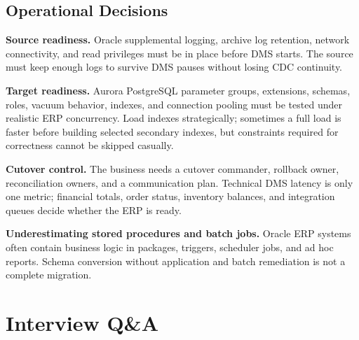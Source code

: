 \subsection{Operational Decisions}
\textbf{Source readiness.} Oracle supplemental logging, archive log retention, network connectivity, and read privileges must be in place before DMS starts. The source must keep enough logs to survive DMS pauses without losing CDC continuity.

\textbf{Target readiness.} Aurora PostgreSQL parameter groups, extensions, schemas, roles, vacuum behavior, indexes, and connection pooling must be tested under realistic ERP concurrency. Load indexes strategically; sometimes a full load is faster before building selected secondary indexes, but constraints required for correctness cannot be skipped casually.

\textbf{Cutover control.} The business needs a cutover commander, rollback owner, reconciliation owners, and a communication plan. Technical DMS latency is only one metric; financial totals, order status, inventory balances, and integration queues decide whether the ERP is ready.

\begin{pitfall}
\textbf{Underestimating stored procedures and batch jobs.} Oracle ERP systems often contain business logic in packages, triggers, scheduler jobs, and ad hoc reports. Schema conversion without application and batch remediation is not a complete migration.
\end{pitfall}

\section{Interview Q\&A}
